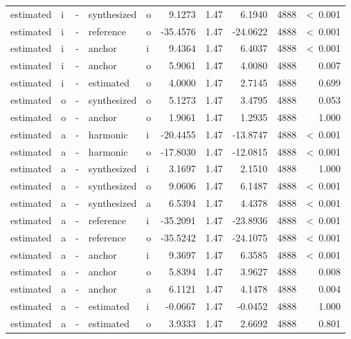 \documentclass[a4paper,man,hidelinks,floatsintext]{apa7}
\begin{document}
\begin{table}[!htbp]
\begin{adjustbox}{max size={\columnwidth}{\textheight}}
\begin{tabular}{llrllrrrrr}
estimated   & i     & - & synthesized & o     &     9.1273 & 1.47 &   6.1940 & 4888 &  \textless~0.001 \\
estimated   & i     & - & reference   & o     &   -35.4576 & 1.47 & -24.0622 & 4888 &  \textless~0.001 \\
estimated   & i     & - & anchor      & i     &     9.4364 & 1.47 &   6.4037 & 4888 &  \textless~0.001 \\
estimated   & i     & - & anchor      & o     &     5.9061 & 1.47 &   4.0080 & 4888 &            0.007 \\
estimated   & i     & - & estimated   & o     &     4.0000 & 1.47 &   2.7145 & 4888 &            0.699 \\
estimated   & o     & - & synthesized & o     &     5.1273 & 1.47 &   3.4795 & 4888 &            0.053 \\
estimated   & o     & - & anchor      & o     &     1.9061 & 1.47 &   1.2935 & 4888 &            1.000 \\
estimated   & a     & - & harmonic    & i     &   -20.4455 & 1.47 & -13.8747 & 4888 &  \textless~0.001 \\
estimated   & a     & - & harmonic    & o     &   -17.8030 & 1.47 & -12.0815 & 4888 &  \textless~0.001 \\
estimated   & a     & - & synthesized & i     &     3.1697 & 1.47 &   2.1510 & 4888 &            1.000 \\
estimated   & a     & - & synthesized & o     &     9.0606 & 1.47 &   6.1487 & 4888 &  \textless~0.001 \\
estimated   & a     & - & synthesized & a     &     6.5394 & 1.47 &   4.4378 & 4888 &  \textless~0.001 \\
estimated   & a     & - & reference   & i     &   -35.2091 & 1.47 & -23.8936 & 4888 &  \textless~0.001 \\
estimated   & a     & - & reference   & o     &   -35.5242 & 1.47 & -24.1075 & 4888 &  \textless~0.001 \\
estimated   & a     & - & anchor      & i     &     9.3697 & 1.47 &   6.3585 & 4888 &  \textless~0.001 \\
estimated   & a     & - & anchor      & o     &     5.8394 & 1.47 &   3.9627 & 4888 &            0.008 \\
estimated   & a     & - & anchor      & a     &     6.1121 & 1.47 &   4.1478 & 4888 &            0.004 \\
estimated   & a     & - & estimated   & i     &    -0.0667 & 1.47 &  -0.0452 & 4888 &            1.000 \\
estimated   & a     & - & estimated   & o     &     3.9333 & 1.47 &   2.6692 & 4888 &            0.801 \\
\hline
\end{tabular}
\end{adjustbox}
\begin{tablenotes} {
\small
}
\end{tablenotes}
\end{table}
      
\end{document}
